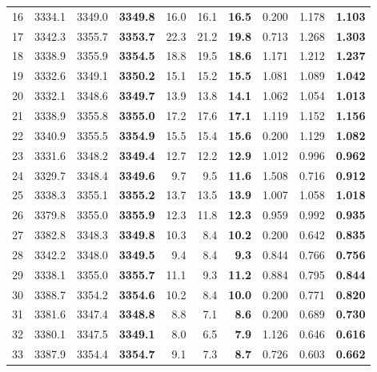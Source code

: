 \documentclass[a4paper,11pt]{article}
\begin{document}
\begin{longtable}{l rrr rrr rrr}
  16 & 3334.1 & 3349.0 & \textbf{3349.8} & 16.0 & 16.1 & \textbf{16.5} & 0.200 & 1.178 & \textbf{1.103} \\
  17 & 3342.3 & 3355.7 & \textbf{3353.7} & 22.3 & 21.2 & \textbf{19.8} & 0.713 & 1.268 & \textbf{1.303} \\
  18 & 3338.9 & 3355.9 & \textbf{3354.5} & 18.8 & 19.5 & \textbf{18.6} & 1.171 & 1.212 & \textbf{1.237} \\
  19 & 3332.6 & 3349.1 & \textbf{3350.2} & 15.1 & 15.2 & \textbf{15.5} & 1.081 & 1.089 & \textbf{1.042} \\
  20 & 3332.1 & 3348.6 & \textbf{3349.7} & 13.9 & 13.8 & \textbf{14.1} & 1.062 & 1.054 & \textbf{1.013} \\
  21 & 3338.9 & 3355.8 & \textbf{3355.0} & 17.2 & 17.6 & \textbf{17.1} & 1.119 & 1.152 & \textbf{1.156} \\
  22 & 3340.9 & 3355.5 & \textbf{3354.9} & 15.5 & 15.4 & \textbf{15.6} & 0.200 & 1.129 & \textbf{1.082} \\
  23 & 3331.6 & 3348.2 & \textbf{3349.4} & 12.7 & 12.2 & \textbf{12.9} & 1.012 & 0.996 & \textbf{0.962} \\
  24 & 3329.7 & 3348.4 & \textbf{3349.6} & 9.7 & 9.5 & \textbf{11.6} & 1.508 & 0.716 & \textbf{0.912} \\
  25 & 3338.3 & 3355.1 & \textbf{3355.2} & 13.7 & 13.5 & \textbf{13.9} & 1.007 & 1.058 & \textbf{1.018} \\
  26 & 3379.8 & 3355.0 & \textbf{3355.9} & 12.3 & 11.8 & \textbf{12.3} & 0.959 & 0.992 & \textbf{0.935} \\
  27 & 3382.8 & 3348.3 & \textbf{3349.8} & 10.3 & 8.4 & \textbf{10.2} & 0.200 & 0.642 & \textbf{0.835} \\
  28 & 3342.2 & 3348.0 & \textbf{3349.5} & 9.4 & 8.4 & \textbf{9.3} & 0.844 & 0.766 & \textbf{0.756} \\
  29 & 3338.1 & 3355.0 & \textbf{3355.7} & 11.1 & 9.3 & \textbf{11.2} & 0.884 & 0.795 & \textbf{0.844} \\
  30 & 3388.7 & 3354.2 & \textbf{3354.6} & 10.2 & 8.4 & \textbf{10.0} & 0.200 & 0.771 & \textbf{0.820} \\
  31 & 3381.6 & 3347.4 & \textbf{3348.8} & 8.8 & 7.1 & \textbf{8.6} & 0.200 & 0.689 & \textbf{0.730} \\
  32 & 3380.1 & 3347.5 & \textbf{3349.1} & 8.0 & 6.5 & \textbf{7.9} & 1.126 & 0.646 & \textbf{0.616} \\
  33 & 3387.9 & 3354.4 & \textbf{3354.7} & 9.1 & 7.3 & \textbf{8.7} & 0.726 & 0.603 & \textbf{0.662} \\

\end{longtable}
\end{document}
